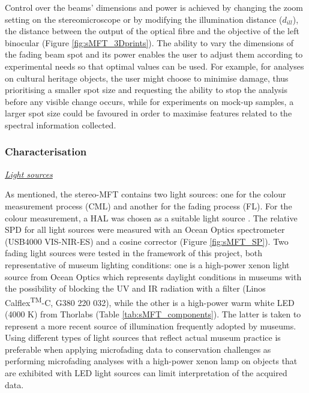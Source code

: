 Control over the beams' dimensions and power is achieved by changing the zoom setting on the stereomicroscope or by modifying the illumination distance ($d_{ill}$), \ie the distance between the output of the optical fibre and the objective of the left binocular (Figure \ref{fig:sMFT_3Dprints}). The ability to vary the dimensions of the fading beam spot and its power enables the user to adjust them according to experimental needs so that optimal values can be used. For example, for analyses on cultural heritage objects, the user might choose to minimise damage, thus prioritising a smaller spot size and requesting the ability to stop the analysis before any visible change occurs, while for experiments on mock-up samples, a larger spot size could be favoured in order to maximise features related to the spectral information collected.




\subsubsection{Characterisation}

\underline{\textit{Light sources}}

As mentioned, the stereo-MFT contains two light sources: one for the colour measurement process (\gls{CML}) and another for the fading process (\gls{FL}). For the colour measurement, a \gls*{HAL} was chosen as a suitable light source \citep[6]{johnston-feller_color_2001}. The relative \gls{SPD} for all light sources were measured with an Ocean Optics spectrometer (USB4000 VIS-NIR-ES) and a cosine corrector (Figure \ref{fig:sMFT_SP}). Two fading light sources were tested in the framework of this project, both representative of museum lighting conditions: one is a high-power xenon light source from Ocean Optics which represents daylight conditions in museums with the possibility of blocking the \gls{UV} and \gls{IR} radiation with a filter (Linos Calflex\textsuperscript{TM}-C, G380 220 032), while the other is a high-power warm white \gls{LED} (4000 \unit{\kelvin}) from Thorlabs (Table \ref{tab:sMFT_components}). The latter is taken to represent a more recent source of illumination frequently adopted by museums. Using different types of light sources that reflect actual museum practice is preferable when applying microfading data to conservation challenges as performing microfading analyses with a high-power xenon lamp on objects that are exhibited with \gls{LED} light sources can limit interpretation of the acquired data.\\

